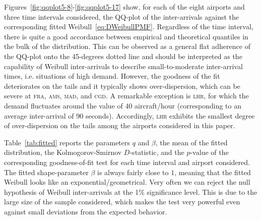 \documentclass[draft,review]{elsarticle}
\makeatletter
\newcommand*{\ie}{i.e.\@\xspace}
\newcommand{\airp}[1]{\textcolor{#1}{\textsc{#1}}}
\makeatother
\begin{document}
Figures~\ref{fig:qqplot5-8}-\ref{fig:qqplot5-17} show, for each of the eight airports and three time intervals considered, the QQ-plot of the inter-arrivals against the corresponding fitted Weibull~\eqref{eq:DWeibullPMF}.
Regardless of the time interval, there is quite a good accordance between empirical and theoretical quantiles in the bulk of the distribution.
This can be observed as a general flat adherence of the QQ-plot onto the 45-degrees dotted line and should be interpreted as the capability of Weibull inter-arrivals to describe small-to-moderate inter-arrival times, \ie{} situations of high demand.
However, the goodness of the fit deteriorates on the tails and it typically shows over-dispersion, which can be severe at \airp{fra}, \airp{ams}, \airp{mad}, and \airp{cgd}.
A remarkable exception is \airp{lhr}, for which the demand fluctuates around the value of 40 aircraft/hour (corresponding to an average inter-arrival of 90 seconds).
Accordingly, \airp{lhr} exhibits the smallest degree of over-dispersion on the tails among the airports considered in this paper.

Table~\ref{tab:fitted} reports the parameters \(q\) and \(\beta\), the mean of the fitted distribution, the Kolmogorov-Smirnov \(D\)-statistic, and the \(p\)-value of the corresponding goodness-of-fit test for each time interval and airport considered.
The fitted shape-parameter \(\beta\) is always fairly close to \(1\), meaning that the fitted Weibull looks like an exponential/geometrical.
Very often we can reject the null hypothesis of Weibull inter-arrivals at the 1\% significance level.
This is due to the large size of the sample considered, which makes the test very powerful even against small deviations from the expected behavior.
\end{document}
